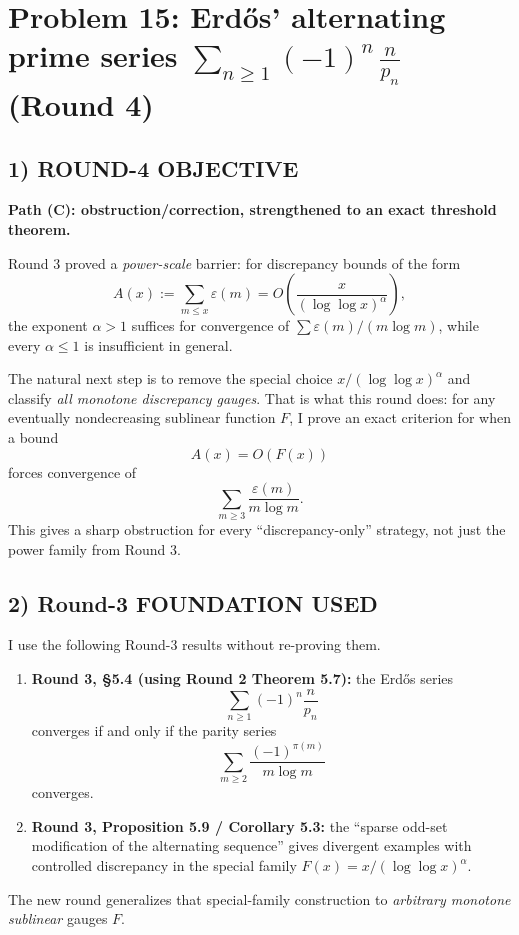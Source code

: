 \section{Problem 15: Erd\H{o}s' alternating prime series $\sum_{n\ge 1} (-1)^n\,\frac{n}{p_n}$ (Round 4)}

\subsection{1) ROUND-4 OBJECTIVE}

\textbf{Path (C): obstruction/correction, strengthened to an exact threshold theorem.}

Round 3 proved a \emph{power-scale} barrier: for discrepancy bounds of the form
\[
A(x):=\sum_{m\le x} \varepsilon(m)=O\!\left(\frac{x}{(\log\log x)^\alpha}\right),
\]
the exponent $\alpha>1$ suffices for convergence of $\sum \varepsilon(m)/(m\log m)$, while every $\alpha\le 1$ is insufficient in general.

The natural next step is to remove the special choice $x/(\log\log x)^\alpha$ and classify \emph{all monotone discrepancy gauges}.  That is what this round does: for any eventually nondecreasing sublinear function $F$, I prove an exact criterion for when a bound
\[
A(x)=O(F(x))
\]
forces convergence of
\[
\sum_{m\ge 3}\frac{\varepsilon(m)}{m\log m}.
\]
This gives a sharp obstruction for every ``discrepancy-only'' strategy, not just the power family from Round 3.

\subsection{2) Round-3 FOUNDATION USED}

I use the following Round-3 results without re-proving them.
\begin{enumerate}
\item \textbf{Round 3, \S5.4 (using Round 2 Theorem 5.7):} the Erd\H{o}s series
\[
\sum_{n\ge 1}(-1)^n\frac{n}{p_n}
\]
converges if and only if the parity series
\[
\sum_{m\ge 2}\frac{(-1)^{\pi(m)}}{m\log m}
\]
converges.
\item \textbf{Round 3, Proposition 5.9 / Corollary 5.3:} the ``sparse odd-set modification of the alternating sequence'' gives divergent examples with controlled discrepancy in the special family $F(x)=x/(\log\log x)^\alpha$.
\end{enumerate}

The new round generalizes that special-family construction to \emph{arbitrary monotone sublinear} gauges $F$.


